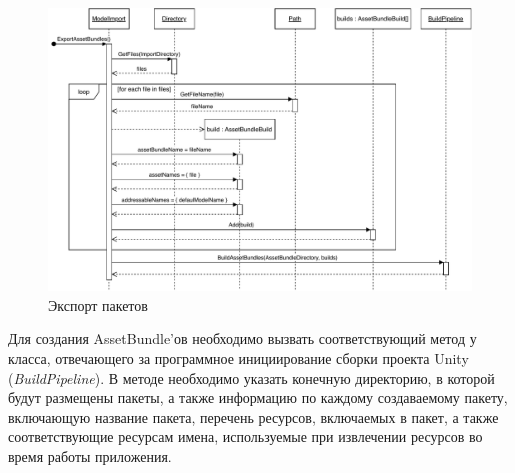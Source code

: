\begin{figure}[!htp]
    \centering
    \includegraphics[width=1.0\textwidth]{images/UML-SExportBundles.pdf}
    \caption{Экспорт пакетов}
    \label{figure:SExportBundles}
\end{figure}

Для создания AssetBundle'ов необходимо вызвать соответствующий метод
у класса, отвечающего за программное инициирование сборки проекта Unity
(\emph{BuildPipeline}). В методе необходимо указать конечную директорию,
в которой будут размещены пакеты, а также информацию по каждому создаваемому пакету,
включающую название пакета, перечень ресурсов, включаемых в пакет,
а также соответствующие ресурсам имена, используемые при извлечении
ресурсов во время работы приложения.\cite{DocUnity,UnityAssetsResourcesBundles}
